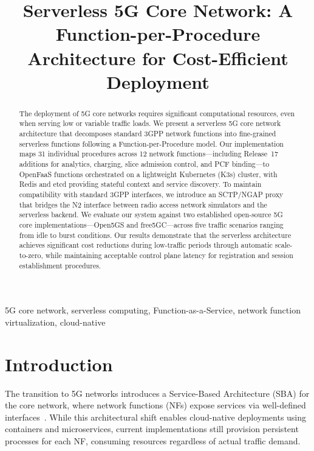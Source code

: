 \documentclass[conference]{IEEEtran}
\begin{document}
\title{Serverless 5G Core Network: A Function-per-Procedure Architecture for Cost-Efficient Deployment}

\author{
}

\maketitle

\begin{abstract}
The deployment of 5G core networks requires significant computational resources, even when serving low or variable traffic loads. We present a serverless 5G core network architecture that decomposes standard 3GPP network functions into fine-grained serverless functions following a Function-per-Procedure model. Our implementation maps 31 individual procedures across 12 network functions---including Release~17 additions for analytics, charging, slice admission control, and PCF binding---to OpenFaaS functions orchestrated on a lightweight Kubernetes (K3s) cluster, with Redis and etcd providing stateful context and service discovery. To maintain compatibility with standard 3GPP interfaces, we introduce an SCTP/NGAP proxy that bridges the N2 interface between radio access network simulators and the serverless backend. We evaluate our system against two established open-source 5G core implementations---Open5GS and free5GC---across five traffic scenarios ranging from idle to burst conditions. Our results demonstrate that the serverless architecture achieves significant cost reductions during low-traffic periods through automatic scale-to-zero, while maintaining acceptable control plane latency for registration and session establishment procedures.
\end{abstract}

\begin{IEEEkeywords}
5G core network, serverless computing, Function-as-a-Service, network function virtualization, cloud-native
\end{IEEEkeywords}

\section{Introduction}

The transition to 5G networks introduces a Service-Based Architecture (SBA) for the core network, where network functions (NFs) expose services via well-defined interfaces~\cite{3gpp-23501}. While this architectural shift enables cloud-native deployments using containers and microservices, current implementations still provision persistent processes for each NF, consuming resources regardless of actual traffic demand.
\end{document}
